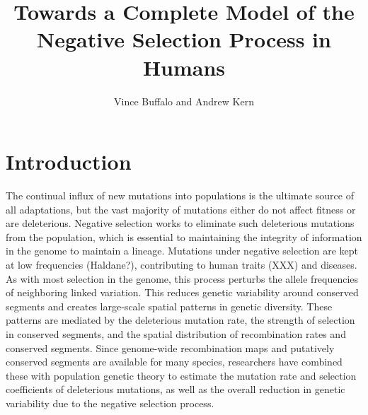 \documentclass[11pt]{article}
\title{Towards a Complete Model of the Negative Selection Process in Humans}
\author{Vince Buffalo and Andrew Kern}
\begin{document}
\maketitle



\begin{abstract} 
\end{abstract}


\section*{Introduction}

The continual influx of new mutations into populations is the ultimate source
of all adaptations, but the vast majority of mutations either do not affect
fitness or are deleterious. Negative selection works to eliminate such
deleterious mutations from the population, which is essential to maintaining
the integrity of information in the genome to maintain a lineage. Mutations
under negative selection are kept at low frequencies (Haldane?), contributing
to human traits (XXX) and diseases. As with most selection in the genome, this
process perturbs the allele frequencies of neighboring linked variation. This
reduces genetic variability around conserved segments and creates large-scale
spatial patterns in genetic diversity. These patterns are mediated by the
deleterious mutation rate, the strength of selection in conserved segments, and
the spatial distribution of recombination rates and conserved segments. Since
genome-wide recombination maps and putatively conserved segments are available
for many species, researchers have combined these with population genetic
theory to estimate the mutation rate and selection coefficients of deleterious
mutations, as well as the overall reduction in genetic variability due to the
negative selection process.
\end{document}
